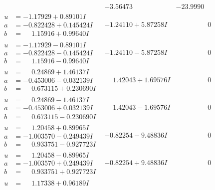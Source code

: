 \documentclass[1p]{elsarticle_modified}
\theoremstyle{definition}
\begin{document}
$$\begin{array}{c|c|c}
 & -3.56473\phantom{ +0.000000I} & -23.9990\phantom{ +0.000000I} \\ \hline\begin{aligned}
u &= -1.17929 + 0.89101 I \\
a &= -0.822428 + 0.145424 I \\
b &= \phantom{-}1.15916 + 0.99640 I\end{aligned}
 & -1.24110 + 5.87258 I & \phantom{-0.000000 } 0 \\ \hline\begin{aligned}
u &= -1.17929 - 0.89101 I \\
a &= -0.822428 - 0.145424 I \\
b &= \phantom{-}1.15916 - 0.99640 I\end{aligned}
 & -1.24110 - 5.87258 I & \phantom{-0.000000 } 0 \\ \hline\begin{aligned}
u &= \phantom{-}0.24869 + 1.46137 I \\
a &= -0.453006 - 0.032139 I \\
b &= \phantom{-}0.673115 + 0.230690 I\end{aligned}
 & \phantom{-}1.42043 + 1.69576 I & \phantom{-0.000000 } 0 \\ \hline\begin{aligned}
u &= \phantom{-}0.24869 - 1.46137 I \\
a &= -0.453006 + 0.032139 I \\
b &= \phantom{-}0.673115 - 0.230690 I\end{aligned}
 & \phantom{-}1.42043 - 1.69576 I & \phantom{-0.000000 } 0 \\ \hline\begin{aligned}
u &= \phantom{-}1.20458 + 0.89965 I \\
a &= -1.003570 - 0.249439 I \\
b &= \phantom{-}0.933751 - 0.927723 I\end{aligned}
 & -0.82254 - 9.48836 I & \phantom{-0.000000 } 0 \\ \hline\begin{aligned}
u &= \phantom{-}1.20458 - 0.89965 I \\
a &= -1.003570 + 0.249439 I \\
b &= \phantom{-}0.933751 + 0.927723 I\end{aligned}
 & -0.82254 + 9.48836 I & \phantom{-0.000000 } 0 \\ \hline\begin{aligned}
u &= \phantom{-}1.17338 + 0.96189 I \\

\end{aligned}
\end{array}$$
\end{document}
